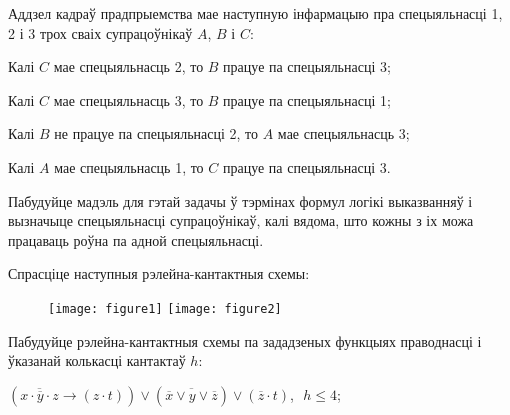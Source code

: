 \begin{problemList}
		\item Аддзел кадраў прадпрыемства мае наступную інфармацыю пра спецыяльнасці 1, 2 і 3 трох сваіх супрацоўнікаў $A$, $B$ і $C$:
		\begin{belarusianEnumerate}
			\item Калі $C$ мае спецыяльнасць 2, то $B$ працуе па спецыяльнасці 3;
			\item Калі $C$ мае спецыяльнасць 3, то $B$ працуе па спецыяльнасці 1;
			\item Калі $B$ не працуе па спецыяльнасці 2, то $A$ мае спецыяльнасць 3;
			\item Калі $A$ мае спецыяльнасць 1, то $C$ працуе па спецыяльнасці 3.
		\end{belarusianEnumerate}
		Пабудуйце мадэль для гэтай задачы ў тэрмінах формул логікі выказванняў і вызначыце спецыяльнасці супрацоўнікаў, калі вядома, што кожны з іх можа працаваць роўна па адной спецыяльнасці. \\
		
		\newpage
		
		\item Спрасціце наступныя рэлейна-кантактныя схемы:\\
		\begin{figure}[H]
			\begin{center}
				\texttt{[image: figure1]}
				\texttt{[image: figure2]}
			\end{center}
		\end{figure}
		
		\item Пабудуйце рэлейна-кантактныя схемы па зададзеных функцыях праводнасці і ўказанай колькасці кантактаў $h$:\\
		\begin{belarusianEnumerate}
			\item $(\overline{x \cdot \overline{y} \cdot z} \to (z \cdot t)) \vee
			(\overline{\overline{x} \vee y \vee \overline{z}}) \vee (\overline{z} \cdot t)$,\,\, $h \le 4$;
			

\end{belarusianEnumerate}
\end{problemList}
